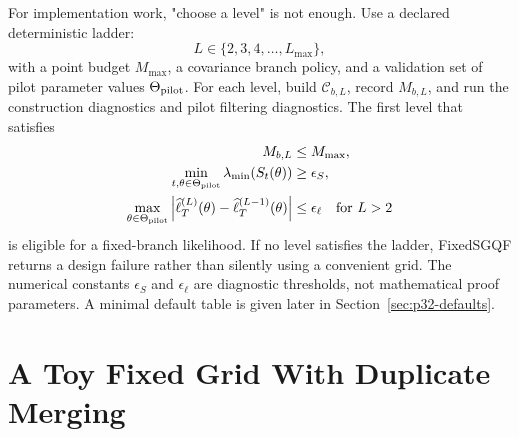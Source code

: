\documentclass[11pt]{article}
\numberwithin{equation}{section}
\newcommand{\ellhat}{\widehat\ell}
\begin{document}
For implementation work, "choose a level" is not enough.  Use a declared
deterministic ladder:
\begin{equation}
  L\in\{2,3,4,\ldots,L_{\max}\},
  \label{eq:p32-level-ladder}
\end{equation}
with a point budget \(M_{\max}\), a covariance branch policy, and a validation
set of pilot parameter values \(\Theta_{\rm pilot}\).  For each level, build
\(\mathcal C_{b,L}\), record \(M_{b,L}\), and run the construction diagnostics
and pilot filtering diagnostics.  The first level that satisfies
\begin{align}
  M_{b,L}&\le M_{\max},
  \label{eq:p32-ladder-budget}\\
  \min_{t,\theta\in\Theta_{\rm pilot}}\lambda_{\min}(S_t(\theta))
  &\ge \epsilon_S,
  \label{eq:p32-ladder-S}\\
  \max_{\theta\in\Theta_{\rm pilot}}
  \left|
  \ellhat_T^{(L)}(\theta)-\ellhat_T^{(L-1)}(\theta)
  \right|
  &\le \epsilon_\ell
  \quad\hbox{for }L>2
  \label{eq:p32-ladder-likelihood}
\end{align}
is eligible for a fixed-branch likelihood.  If no level satisfies the ladder,
FixedSGQF returns a design failure rather than silently using a convenient
grid.  The numerical constants \(\epsilon_S\) and \(\epsilon_\ell\) are
diagnostic thresholds, not mathematical proof parameters.  A minimal default
table is given later in Section~\ref{sec:p32-defaults}.

\section{A Toy Fixed Grid With Duplicate Merging}
\label{sec:p31-toy-grid}
\end{document}
